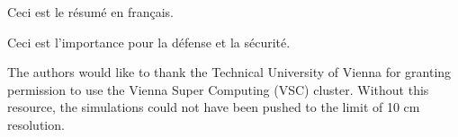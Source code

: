 \documentclass[pdfa]{drdc-report}
\begin{document}
\begin{fabstract}
  Ceci est le r\'esum\'e en fran\c{c}ais.
\end{fabstract}

\begin{fsignificance}
  Ceci est l'importance pour la d\'efense et la s\'ecurit\'e.
\end{fsignificance}

\tableofcontents\clearpage
\listoffigures\clearpage
\listoftables
\begin{acknowledgements}
The authors would like to thank the Technical University of Vienna for granting permission to use the Vienna Super Computing (VSC) cluster. Without this resource, the simulations could not have been pushed to the limit of 10 cm resolution.
\end{acknowledgements}
\let\cleardoublepage\clearpage



















\end{document}
